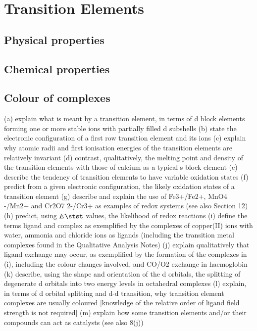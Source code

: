 \section{Transition Elements}
\subsection{Physical properties}
\subsection{Chemical properties}
\subsection{Colour of complexes}

(a) explain what is meant by a transition element, in terms of d block elements forming one or more stable ions with partially filled d subshells
(b) state the electronic configuration of a first row transition element and its ions
(c) explain why atomic radii and first ionisation energies of the transition elements are relatively invariant
(d) contrast, qualitatively, the melting point and density of the transition elements with those of calcium as a
typical s block element
(e) describe the tendency of transition elements to have variable oxidation states
(f) predict from a given electronic configuration, the likely oxidation states of a transition element
(g) describe and explain the use of Fe3+/Fe2+, MnO4
-/Mn2+ and Cr2O7
2-/Cr3+ as examples of redox systems
(see also Section 12)
(h) predict, using $E\stst$ values, the likelihood of redox reactions
(i) define the terms ligand and complex as exemplified by the complexes of copper(II) ions with water,
ammonia and chloride ions as ligands
(including the transition metal complexes found in the Qualitative Analysis Notes)
(j) explain qualitatively that ligand exchange may occur, as exemplified by the formation of the complexes in
(i), including the colour changes involved, and CO/O2 exchange in haemoglobin
(k) describe, using the shape and orientation of the d orbitals, the splitting of degenerate d orbitals into two
energy levels in octahedral complexes
(l) explain, in terms of d orbital splitting and d-d transition, why transition element complexes are usually
coloured
[knowledge of the relative order of ligand field strength is not required]
(m) explain how some transition elements and/or their compounds can act as catalysts (see also 8(j)) 
